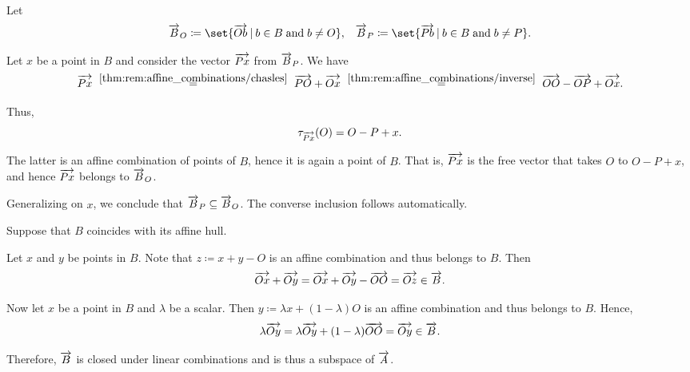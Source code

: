 \begin{defproof}
   Let
  \begin{align*}
    \vect B_O \coloneqq \set{ \vect{Ob} \given b \in B \T{and} b \neq O },
    &&
    \vect B_P \coloneqq \set{ \vect{Pb} \given b \in B \T{and} b \neq P }.
  \end{align*}

  Let \( x \) be a point in \( B \) and consider the vector \( \overrightarrow{P x} \) from \( \overrightarrow{B}_P \). We have
  \begin{equation*}
    \vect{P x}
    \reloset {\ref{thm:rem:affine_combinations/chasles}} =
    \vect{PO} + \vect{O x}
    \reloset {\ref{thm:rem:affine_combinations/inverse}} =
    \vect{OO} - \vect{OP} + \vect{O x}.
  \end{equation*}

  Thus,
  \begin{equation*}
    \tau_{\overrightarrow{Px}}(O) = O - P + x.
  \end{equation*}

  The latter is an affine combination of points of \( B \), hence it is again a point of \( B \). That is, \( \overrightarrow{Px} \) is the free vector that takes \( O \) to \( O - P + x \), and hence \( \overrightarrow{Px} \) belongs to \( \overrightarrow{B}_O \).

  Generalizing on \( x \), we conclude that \( \overrightarrow{B}_P \subseteq \overrightarrow{B}_O \). The converse inclusion follows automatically.

   Suppose that \( B \) coincides with its affine hull.

  Let \( x \) and \( y \) be points in \( B \). Note that \( z \coloneqq x + y - O \) is an affine combination and thus belongs to \( B \). Then
  \begin{equation*}
    \overrightarrow{Ox} + \overrightarrow{Oy}
    =
    \overrightarrow{Ox} + \overrightarrow{Oy} - \overrightarrow{OO}
    =
    \overrightarrow{Oz}
    \in
    \overrightarrow{B}.
  \end{equation*}

  Now let \( x \) be a point in \( B \) and \( \lambda \) be a scalar. Then \( y \coloneqq \lambda x + (1 - \lambda) O \) is an affine combination and thus belongs to \( B \). Hence,
  \begin{equation*}
    \lambda \overrightarrow{Oy}
    =
    \lambda \overrightarrow{Oy} + (1 - \lambda) \overrightarrow{OO}
    =
    \overrightarrow{Oy}
    \in
    \overrightarrow{B}.
  \end{equation*}

  Therefore, \( \overrightarrow{B} \) is closed under linear combinations and is thus a subspace of \( \overrightarrow{A} \).


\end{defproof}
